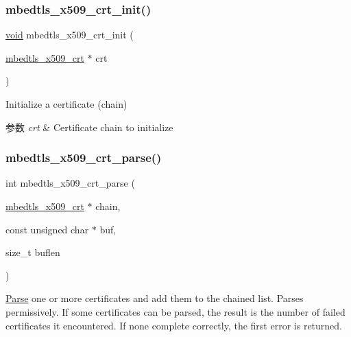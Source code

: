 \subsubsection{\texorpdfstring{mbedtls\+\_\+x509\+\_\+crt\+\_\+init()}{mbedtls\_x509\_crt\_init()}}
{\footnotesize\ttfamily \hyperlink{interfacevoid}{void} mbedtls\+\_\+x509\+\_\+crt\+\_\+init (\begin{DoxyParamCaption}\item[{\hyperlink{structmbedtls__x509__crt}{mbedtls\+\_\+x509\+\_\+crt} $\ast$}]{crt }\end{DoxyParamCaption})}



Initialize a certificate (chain) 


\begin{DoxyParams}{参数}
{\em crt} & Certificate chain to initialize \\
\hline
\end{DoxyParams}
\mbox{\label{group__x509__module_ga033567483649030f7f859db4f4cb7e14}} 
\subsubsection{\texorpdfstring{mbedtls\+\_\+x509\+\_\+crt\+\_\+parse()}{mbedtls\_x509\_crt\_parse()}}
{\footnotesize\ttfamily int mbedtls\+\_\+x509\+\_\+crt\+\_\+parse (\begin{DoxyParamCaption}\item[{\hyperlink{structmbedtls__x509__crt}{mbedtls\+\_\+x509\+\_\+crt} $\ast$}]{chain,  }\item[{const unsigned char $\ast$}]{buf,  }\item[{size\+\_\+t}]{buflen }\end{DoxyParamCaption})}



\hyperlink{struct_parse}{Parse} one or more certificates and add them to the chained list. Parses permissively. If some certificates can be parsed, the result is the number of failed certificates it encountered. If none complete correctly, the first error is returned. 



